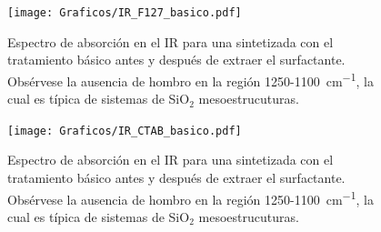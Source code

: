 			\begin{figure}[tbh!]
			\begin{center}
			\texttt{[image: Graficos/IR\_F127\_basico.pdf]}
			\caption[FTIR \pdmF\space tratamiento básico.]{Espectro de absorción en el IR para una \pdmF\space sintetizada con el tratamiento básico antes y después de extraer el surfactante. Obsérvese la ausencia de hombro en la región 1250-\SI{1100}{\cm^{-1}}, la cual es típica de sistemas de SiO$_2$ mesoestrucuturas.}
			\label{fig:IR_F127_basico}
			\end{center}
			\end{figure}


			\begin{figure}[t!]
			\begin{center}
			\texttt{[image: Graficos/IR\_CTAB\_basico.pdf]}
			\caption[FTIR \pdmC\space tratamiento básico.]{Espectro de absorción en el IR para una \pdmC\space sintetizada con el tratamiento básico antes y después de extraer el surfactante. Obsérvese la ausencia de hombro en la región 1250-\SI{1100}{\cm^{-1}}, la cual es típica de sistemas de SiO$_2$ mesoestrucuturas.}
			\label{fig:IR_CTAB_basico}
			\end{center}
			\end{figure}
		\null
		\vfill		

\let\thispagestyle=\originalstyle